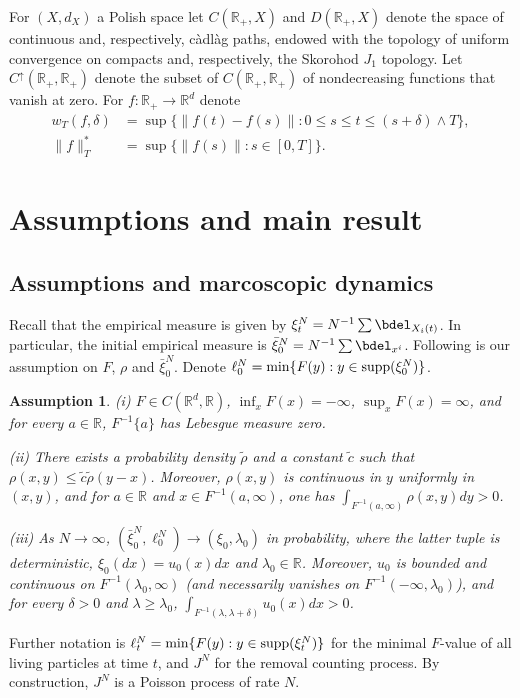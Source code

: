 \documentclass[11pt]{amsart}
\theoremstyle{plain}
\newtheorem{assumption}[theorem]{Assumption}
\newcommand{\beginsec}{
\setcounter{equation}{0}
}
\newcommand{\la}{\lambda}
\newcommand{\del}{\delta}
\newcommand{\R}{{\mathbb R}}
\newcommand{\supp}{{\rm supp}}
\newcommand{\w}{\wedge}
\newcommand{\iy}{\infty}
\newcommand{\up}{\uparrow}
\newcommand{\cadlag}{c\`adl\`ag }
\newcommand{\F}{F}
\begin{document}
For $(X,d_X)$ a Polish space let $C(\R_+,X)$ and $D(\R_+,X)$
denote the space of continuous and, respectively, \cadlag paths,
endowed with the topology of uniform convergence on compacts
and, respectively, the Skorohod $J_1$ topology.
Let $C^\up(\R_+,\R_+)$ denote the subset of $C(\R_+,\R_+)$
of nondecreasing functions that vanish at zero.
For $f:\R_+\to\R^d$ denote
\begin{align*}
w_T(f,\del)&=\sup\{\|f(t)-f(s)\|:0\le s\le t\le (s+\del)\w T\},
\\
\|f\|^*_T&=\sup\{\|f(s)\|:s\in[0,T]\}.
\end{align*}


\section{Assumptions and main result}\label{sec2}
\beginsec

\subsection{Assumptions and marcoscopic dynamics}
Recall that the empirical measure is given by $\xi^N_t=N^{-1}\sum\bdel_{X_i(t)}$.
In particular, the initial empirical measure is $\bar\xi^N_0=N^{-1}\sum\bdel_{x^i}$.
Following is our assumption on $\F$, $\rho$ and $\bar\xi^N_0$.
Denote $\ell^N_0=\min\{F(y):y\in\supp(\xi^N_0)\}$.

\begin{assumption}\label{assn10} (i)
$\F\in C(\R^d,\R)$, $\inf_x\F(x)=-\iy$, $\sup_x\F(x)=\infty$, and
for every $a\in\R$, $\F^{-1}\{a\}$ has Lebesgue measure zero.

(ii)
There exists a probability density $\tilde\rho$ and a constant $\tilde c$
such that $\rho(x,y)\le \tilde c\tilde\rho(y-x)$.
Moreover, $\rho(x,y)$ is continuous in $y$ uniformly in $(x,y)$, and
for $a\in\R$ and $x\in \F^{-1}(a,\iy)$, one has
$\int_{\F^{-1}(a,\iy)}\rho(x,y)dy>0$.

(iii)
As $N\to\iy$, $(\bar\xi^N_0,\ell^N_0)\to(\xi_0,\la_0)$ in probability, 
where the latter tuple is deterministic,
$\xi_0(dx)=u_0(x)dx$ and $\la_0\in\R$.
Moreover, $u_0$ is bounded and continuous on $\F^{-1}(\la_0,\iy)$
(and necessarily vanishes on $F^{-1}(-\iy,\la_0)$), and
for every $\del>0$ and $\la\ge \la_0$, $\int_{\F^{-1}(\la,\la+\del)} u_0(x)dx>0$.
\end{assumption}

Further notation is $\ell^N_t=\min\{F(y):y\in\supp(\xi^N_t)\}$
for the minimal $\F$-value of all living particles at time $t$,
and $J^N$ for the removal counting process. By construction,
$J^N$ is a Poisson process of rate $N$.
\end{document}
